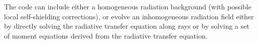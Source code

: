 








The code can include either a homogeneous radiation background (with possible local self-shielding corrections), or evolve an inhomogeneous radiation field either by directly solving the radiative transfer equation along rays or by solving a set of moment equations derived from the radiative transfer equation.  

